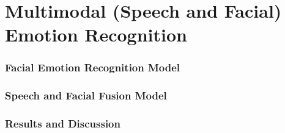 \chapter{Multimodal (Speech and Facial) Emotion Recognition}
\label{chapter:fusion}

\subsection{Facial Emotion Recognition Model}

\subsection{Speech and Facial Fusion Model}

\subsection{Results and Discussion}

